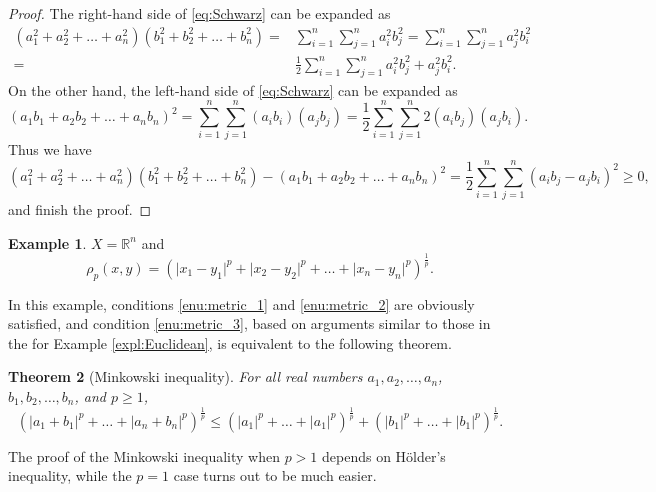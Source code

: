 \documentclass[a4paper,12pt]{article}
\newcommand{\Holder}{H\"{o}lder}
\newcommand{\realR}{\mathbb{R}}
\newtheorem{thm}{Theorem}[section]
\theoremstyle{definition}
\newtheorem{expl}[thm]{Example}
\theoremstyle{remark}
\begin{document}
\begin{proof}
  The right-hand side of \eqref{eq:Schwarz} can be expanded as
  \begin{equation*}
    \begin{split}
      (a^2_1 + a^2_2 + \dotsc + a^2_n) (b^2_1 + b^2_2 + \dotsc + b^2_n) ={}& \sum^n_{i=1} \sum^n_{j=1} a^2_i b^2_j = \sum^n_{i=1} \sum^n_{j=1} a^2_j b^2_i \\
      ={}& \frac{1}{2} \sum^n_{i=1} \sum^n_{j=1} a^2_i b^2_j + a^2_j b^2_i.
    \end{split}
  \end{equation*}
On the other hand, the left-hand side of \eqref{eq:Schwarz} can be expanded as
\begin{equation*}
  (a_1b_1 + a_2b_2 + \dotsc + a_nb_n)^2 = \sum^n_{i=1} \sum^n_{j=1} (a_ib_i)(a_jb_j) = \frac{1}{2} \sum^n_{i=1} \sum^n_{j=1} 2(a_ib_j)(a_jb_i).
\end{equation*}
Thus we have
\begin{equation*}
  (a^2_1 + a^2_2 + \dotsc + a^2_n) (b^2_1 + b^2_2 + \dotsc + b^2_n) - (a_1b_1 + a_2b_2 + \dotsc + a_nb_n)^2 = \frac{1}{2} \sum^n_{i=1} \sum^n_{j=1} (a_ib_j - a_jb_i)^2 \geq 0,
\end{equation*}
and finish the proof.
\end{proof}

\begin{expl}
  $X = \realR^n$ and
  \begin{equation*}
    \rho_p(x,y) = \left( \lvert x_1 - y_1 \rvert^p + \lvert x_2 - y_2 \rvert^p + \dotsc + \lvert x_n - y_n \rvert^p \right)^{\frac{1}{p}}.
  \end{equation*}
\end{expl}
In this example, conditions \ref{enu:metric_1} and \ref{enu:metric_2} are obviously satisfied, and condition \ref{enu:metric_3}, based on arguments similar to those in the for Example \ref{expl:Euclidean}, is equivalent to the following theorem.
\begin{thm}[Minkowski inequality]
  For all real numbers $a_1, a_2, \dotsc, a_n$, $b_1, b_2, \dotsc, b_n$, and $p \geq 1$,
  \begin{equation*}
    (\lvert a_1 + b_1 \rvert^p + \dotsc + \lvert a_n + b_n \rvert^p)^{\frac{1}{p}} \leq (\lvert a_1 \rvert^p + \dotsc + \lvert a_1 \rvert^p)^{\frac{1}{p}} + (\lvert b_1 \rvert^p + \dotsc + \lvert b_1 \rvert^p)^{\frac{1}{p}}.
  \end{equation*}
\end{thm}
The proof of the Minkowski inequality when $p > 1$ depends on \Holder's inequality, while the $p = 1$ case turns out to be much easier.
\end{document}
